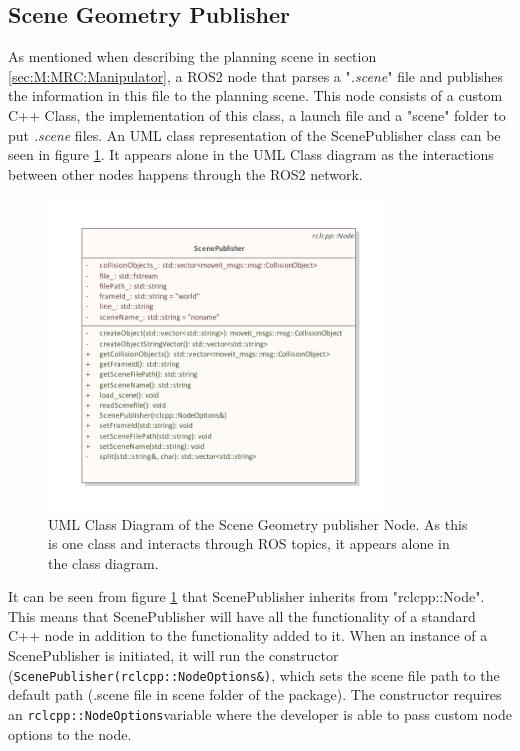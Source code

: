 \subsection{Scene Geometry Publisher} \label{sec:M:A:SceneGeometryPublisher}
As mentioned when describing the planning scene in section \ref{sec:M:MRC:Manipulator}, a ROS2 node that parses a "\textit{.scene}" file and publishes the information in this file to the planning scene. This node consists of a custom C++ Class, the implementation of this class, a launch file and a "scene" folder to put \textit{.scene} files. An UML class representation of the ScenePublisher class can be seen in figure \ref{fig:scenePublisherUML}. It appears alone in the UML Class diagram as the interactions between other nodes happens through the ROS2 network.

\begin{figure}[htp]
  \centering
  \includegraphics[width = 0.8\textwidth]{Figures/scene_geometry_publisher.pdf}
  \caption{UML Class Diagram of the Scene Geometry publisher Node. As this is one class and interacts through ROS topics, it appears alone in the class diagram.}
  \label{fig:scenePublisherUML}
\end{figure}

It can be seen from figure \ref{fig:scenePublisherUML} that ScenePublisher inherits from "rclcpp::Node". This means that ScenePublisher will have all the functionality of a standard C++ node in addition to the functionality added to it. When an instance of a ScenePublisher is initiated, it will run the constructor (\lstinline{ScenePublisher(rclcpp::NodeOptions&)}, which sets the scene file path to the default path (.scene file in scene folder of the package). The constructor requires an \lstinline{rclcpp::NodeOptions}variable where the developer is able to pass custom node options to the node. 

